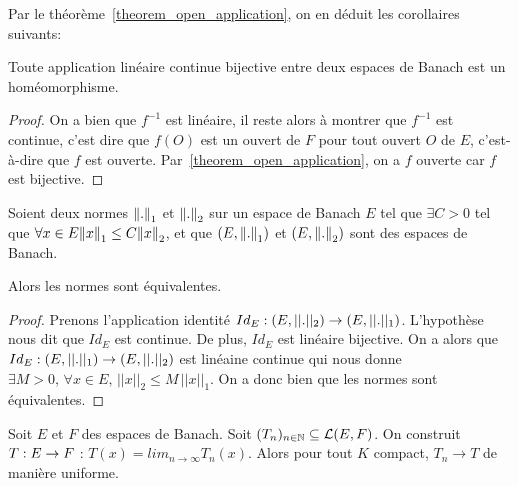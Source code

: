 Par le théorème~\ref{theorem_open_application}, on en déduit les corollaires
suivants:

\begin{corollary}
	Toute application linéaire continue bijective entre deux espaces de Banach
	est un homéomorphisme.
\end{corollary}

\ifdefined\outputproof
\begin{proof}
	On a bien que $f^{-1}$ est linéaire, il reste alors à montrer que $f^{-1}$
	est continue, c'est dire que $f(O)$ est un ouvert de $F$ pour tout ouvert
	$O$ de $E$, c'est-à-dire que $f$ est ouverte.
	Par~\ref{theorem_open_application}, on a $f$ ouverte car $f$ est bijective.
\end{proof}
\fi

\begin{corollary}
	Soient deux normes $\norm{.}_{1}$ et $\norm{.}_{2}$ sur un espace de
	Banach $E$ tel que $\exists C > 0$ tel que $\forall x \in E
	\norm{x}_{1} \leq C \norm{x}_{2}$, et que
	$(E, \norm{.}_{1})$ et
	$(E, \norm{.}_{2})$
	sont des espaces de Banach.

	Alors les normes sont équivalentes.
\end{corollary}

\ifdefined\outputproof
\begin{proof}
	Prenons l'application identité $Id_{E} : (E, ||.||_{2}) \rightarrow (E,
	||.||_{1})$. L'hypothèse nous dit que $Id_{E}$ est continue. De plus,
	$Id_{E}$ est linéaire bijective. On a alors que
	$Id_{E} : (E, ||.||_{1}) \rightarrow (E, ||.||_{2})$ est linéaine
	continue qui nous donne $\exists M > 0, \, \forall x \in E, \,
	||x||_{2} \leq M \, ||x||_{1}$. On a donc bien que les normes sont
	équivalentes.
\end{proof}
\fi

\begin{corollary}
	Soit $E$ et $F$ des espaces de Banach.
	Soit $(T_{n})_{n \in \mathbb{N}} \subseteq \mathcal{L}(E, F)$. On
	construit $T : E \rightarrow F$ : $T(x) = lim_{n \rightarrow \infty}
	T_{n}(x)$. Alors pour tout $K$ compact, $T_{n} \rightarrow T$ de manière
	uniforme.
\end{corollary}
